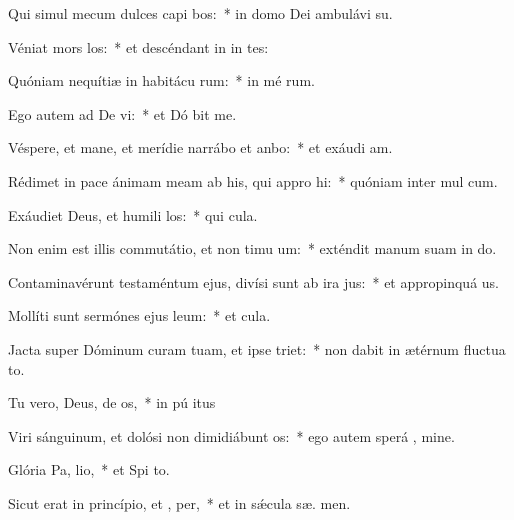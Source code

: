 \item Qui simul mecum dulces capi bos:~* in domo Dei ambulávi  su.
\item Véniat mors  los:~* et descéndant in in tes:
\item Quóniam nequítiæ in habitácu rum:~* in mé rum.
\item Ego autem ad De vi:~* et Dó bit me.
\item Véspere, et mane, et merídie narrábo et anbo:~* et exáudi  am.
\item Rédimet in pace ánimam meam ab his, qui appro hi:~* quóniam inter mul  cum.
\item Exáudiet Deus, et humili los:~* qui   cula.
\item Non enim est illis commutátio, et non timu um:~* exténdit manum suam in do.
\item Contaminavérunt testaméntum ejus, divísi sunt ab ira  jus:~* et appropinquá  us.
\item Mollíti sunt sermónes ejus  leum:~* et   cula.
\item Jacta super Dóminum curam tuam, et ipse  triet:~* non dabit in ætérnum fluctua to.
\item Tu vero, Deus, de os,~* in pú itus
\item Viri sánguinum, et dolósi non dimidiábunt  os:~* ego autem sperá  , mine.
\item Glória Pa,  lio,~* et Spi to.
\item Sicut erat in princípio, et ,  per,~* et in sǽcula sæ. men.
